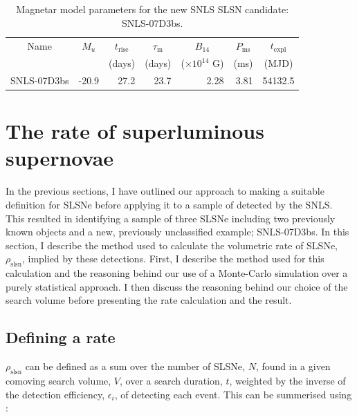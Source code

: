 \begin{table}
\begin{center}
\caption{Magnetar model parameters for the new SNLS SLSN candidate: SNLS-07D3bs.}
\label{tab:07d3bsParams}
\begin{tabular}{|l|r|r|r|r|r|r|}
\hline
  \multicolumn{1}{|c|}{Name} &
  \multicolumn{1}{c|}{$M_u$} &
  \multicolumn{1}{c|}{$t_\mathrm{rise}$} &
  \multicolumn{1}{c|}{$\tau_\mathrm{m}$} &
  \multicolumn{1}{c|}{$B_{14}$} &
  \multicolumn{1}{c|}{$P_{\mathrm{ms}}$} &
  \multicolumn{1}{c|}{$t_\mathrm{expl}$} \\ & &
  \multicolumn{1}{c|}{(days)} &
  \multicolumn{1}{c|}{(days)} &
  \multicolumn{1}{c|}{($\times10^{14}$ G)} &
  \multicolumn{1}{c|}{(ms)} &
  \multicolumn{1}{c|}{(MJD)} \\
\hline
SNLS-07D3bs & -20.9 &  27.2 & 23.7 & 2.28 & 3.81 & 54132.5\\
\hline
\end{tabular}
\end{center}
\end{table}

\section{The rate of superluminous supernovae}
\label{sec:MC}
In the previous sections, I have outlined our approach to making a suitable definition for SLSNe before applying it to a sample of  detected by the SNLS. This resulted in identifying a sample of three SLSNe including two previously known objects and a new, previously unclassified example; SNLS-07D3bs. In this section, I describe the method used to calculate the volumetric rate of SLSNe, $\rho_{\mathrm{slsn}}$, implied by these detections. First, I describe the method used for this calculation and the reasoning behind our use of a Monte-Carlo simulation over a purely statistical approach. I then discuss the reasoning behind our choice of the search volume before presenting the rate calculation and the result.

\subsection{Defining a rate}
\label{sec:method}
$\rho_{\mathrm{slsn}}$ can be defined as a sum over the number of SLSNe, $N$, found in a given comoving search volume, $V$, over a search duration, $t$, weighted by the inverse of the detection efficiency, $\epsilon_{i}$, of detecting each event. This can be summerised using :

